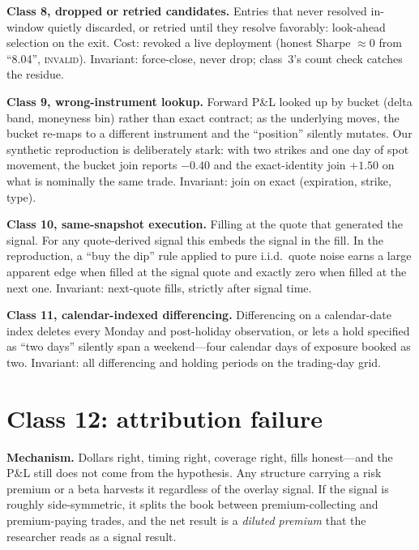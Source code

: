 \documentclass[11pt]{article}
\begin{document}
\textbf{Class 8, dropped or retried candidates.} Entries that never resolved in-window quietly
discarded, or retried until they resolve favorably: look-ahead selection on the exit. Cost:
revoked a live deployment (honest Sharpe $\approx 0$ from ``8.04'', \textsc{invalid}).
Invariant: force-close, never drop; class~3's count check catches the residue.

\textbf{Class 9, wrong-instrument lookup.} Forward P\&L looked up by bucket (delta band,
moneyness bin) rather than exact contract; as the underlying moves, the bucket re-maps to a
different instrument and the ``position'' silently mutates. Our synthetic reproduction is
deliberately stark: with two strikes and one day of spot movement, the bucket join reports
$-0.40$ and the exact-identity join $+1.50$ on what is nominally the same trade. Invariant:
join on exact (expiration, strike, type).

\textbf{Class 10, same-snapshot execution.} Filling at the quote that generated the signal. For
any quote-derived signal this embeds the signal in the fill. In the reproduction, a ``buy the
dip'' rule applied to pure i.i.d.\ quote noise earns a large apparent edge when filled at the
signal quote and exactly zero when filled at the next one. Invariant: next-quote fills,
strictly after signal time.

\textbf{Class 11, calendar-indexed differencing.} Differencing on a calendar-date index deletes
every Monday and post-holiday observation, or lets a hold specified as ``two days'' silently
span a weekend---four calendar days of exposure booked as two. Invariant: all differencing and
holding periods on the trading-day grid.

\section{Class 12: attribution failure}\label{sec:attr}
\textbf{Mechanism.} Dollars right, timing right, coverage right, fills honest---and the P\&L
still does not come from the hypothesis. Any structure carrying a risk premium or a beta
harvests it regardless of the overlay signal. If the signal is roughly side-symmetric, it
splits the book between premium-collecting and premium-paying trades, and the net result is a
\emph{diluted premium} that the researcher reads as a signal result.
\end{document}
